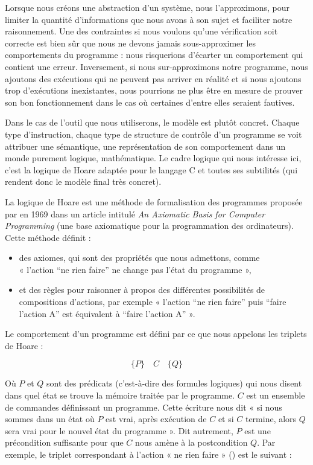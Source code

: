 Lorsque nous créons une abstraction d'un système, nous l'approximons, pour limiter
la quantité d'informations que nous avons à son sujet et faciliter notre
raisonnement. Une des contraintes si nous voulons qu'une vérification soit
correcte est bien sûr que nous ne devons jamais sous-approximer les comportements
du programme : nous risquerions d'écarter un comportement qui contient une erreur.
Inversement, si nous sur-approximons notre programme, nous ajoutons des exécutions
qui ne peuvent pas arriver en réalité et si nous ajoutons trop d'exécutions
inexistantes, nous pourrions ne plus être en mesure de prouver son bon
fonctionnement dans le cas où certaines d'entre elles seraient fautives.



Dans le cas de l'outil que nous utiliserons, le modèle est plutôt concret.
Chaque type d'instruction, chaque type de structure de contrôle d'un programme
se voit attribuer une sémantique, une représentation de son comportement dans
un monde purement logique, mathématique. Le cadre logique qui nous intéresse
ici, c'est la logique de Hoare adaptée pour le langage C et toutes ses
subtilités (qui rendent donc le modèle final très concret).




La logique de Hoare est une méthode de formalisation des programmes proposée
par 
en 1969 dans un article intitulé \textit{An Axiomatic Basis for
Computer Programming} (une base axiomatique pour la programmation des
ordinateurs). Cette méthode définit :
\begin{itemize}
\item des axiomes, qui sont des propriétés que nous admettons, comme \\
« l'action “ne rien faire” ne change pas l'état du programme »,
\item et des règles pour raisonner à propos des différentes possibilités de
compositions d'actions, par exemple « l'action “ne rien faire” puis “faire
l'action A” est équivalent à “faire l'action A” ».
\end{itemize}


Le comportement d'un programme est défini par ce que nous appelons les triplets
de Hoare :



$$\{P\} \quad C \quad \{Q\}$$



Où $P$ et $Q$ sont des prédicats (c'est-à-dire des formules logiques) qui nous disent dans
quel état se trouve la mémoire traitée par le programme. $C$ est un ensemble de
commandes définissant un programme. Cette écriture nous dit « si nous sommes
dans un état où $P$ est vrai, après exécution de $C$ et si $C$ termine,
alors $Q$ sera vrai pour le nouvel état du programme ». Dit autrement, $P$ est
une précondition suffisante pour que $C$ nous amène à la postcondition $Q$.
Par exemple, le triplet correspondant à l'action « ne rien faire »
() est le suivant :





